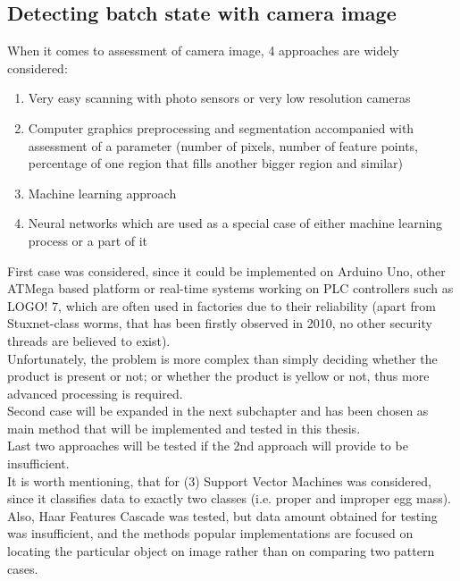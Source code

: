 \documentclass[12pt,twoside,a4paper]{article}
\begin{document}
\subsection{Detecting batch state with camera image}

When it comes to assessment of camera image, 4 approaches are widely considered:
\begin{enumerate}
\item Very easy scanning with photo sensors or very low resolution cameras
\item Computer graphics preprocessing and segmentation accompanied with assessment of a parameter (number of pixels, number of feature points, percentage of one region that fills another bigger region and similar)
\item Machine learning approach
\item Neural networks which are used as a special case of either machine learning process or a part of it 
\end{enumerate}
First case was considered, since it could be implemented on Arduino Uno, other ATMega based platform or real-time systems working on PLC controllers such as LOGO! 7, which are often used in factories due to their reliability (apart from Stuxnet-class worms, that has been firstly observed in 2010, no other security threads are believed to exist).\\
Unfortunately, the problem is more complex than simply deciding whether the product is present or not; or whether the product is yellow or not, thus more advanced processing is required.\\

Second case will be expanded in the next subchapter and has been chosen as main method that will be implemented and tested in this thesis.\\

Last two approaches will be tested if the 2nd approach will provide to be insufficient.\\
It is worth mentioning, that for (3) Support Vector Machines was considered, since it classifies data to exactly two classes (i.e. proper and improper egg mass).\\

Also, Haar Features Cascade was tested, but data amount obtained for testing was insufficient, and the methods popular implementations are focused on locating the particular object on image rather than on comparing two pattern cases.\\
\end{document}

